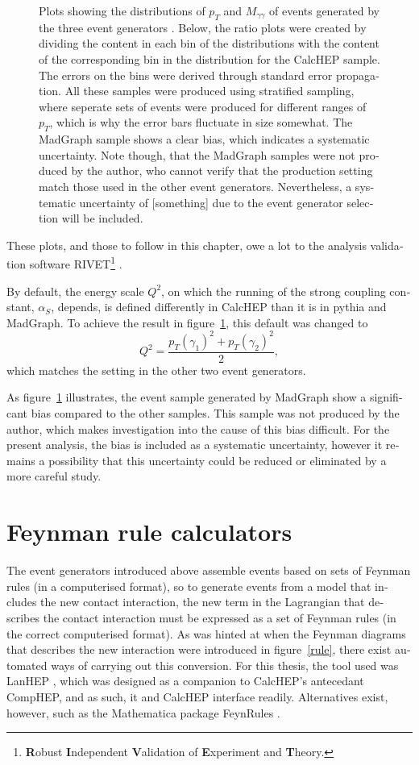 \begin{english}
\begin{figure}[htp]
\begin{minipage}[b]{.3\textwidth}
\phantom{p}
\end{minipage}
\caption{Plots showing the distributions of $p_T$ and $M_{\gamma\gamma}$ of events generated by the three event generators \cite{calchep} \cite{pythia} \cite{madgraph5}. Below, the ratio plots were created by dividing the content in each bin of the distributions with the content of the corresponding bin in the distribution for the CalcHEP sample. The errors on the bins were derived through standard error propagation. All these samples were produced using stratified sampling, where seperate sets of events were produced for different ranges of $p_T$, which is why the error bars fluctuate in size somewhat. The MadGraph sample shows a clear bias, which indicates a systematic uncertainty. Note though, that the MadGraph samples were not produced by the author, who cannot verify that the production setting match those used in the other event generators. Nevertheless, a systematic uncertainty of [something] due to the event generator selection will be included.
\label{evgen}}
\end{figure}

These plots, and those to follow in this chapter, owe a lot to the analysis validation software RIVET\footnote{\textbf{R}obust \textbf{I}ndependent \textbf{V}alidation of \textbf{E}xperiment and \textbf{T}heory.} \cite{rivet}.

By default, the energy scale $Q^2$, on which the running of the strong coupling constant, $\alpha_S$, depends, is defined differently in CalcHEP than it is in pythia and MadGraph. To achieve the result in figure~\ref{evgen}, this default was changed to 
\[Q^2=\frac{p_T(\gamma_1)^2+p_T(\gamma_2)^2}{2},\]
which matches the setting in the other two event generators.

As figure~\ref{evgen} illustrates, the event sample generated by MadGraph show a significant bias compared to the other samples. This sample was not produced by the author, which makes investigation into the cause of this bias difficult. For the present analysis, the bias is included as a systematic uncertainty, however it remains a possibility that this uncertainty could be reduced or eliminated by a more careful study.


\section{Feynman rule calculators}
The event generators introduced above assemble events based on sets of Feynman rules (in a computerised format), so to generate events from a model that includes the new contact interaction, the new term in the Lagrangian that describes the contact interaction must be expressed as a set of Feynman rules (in the correct computerised format). As was hinted at when the Feynman diagrams that describes the new interaction were introduced in figure~\ref{rule}, there exist automated ways of carrying out this conversion. For this thesis, the tool used was LanHEP \cite{lanhep}, which was designed as a companion to CalcHEP's antecedant CompHEP, and as such, it and CalcHEP interface readily. Alternatives exist, however, such as the Mathematica package FeynRules \cite{feynrules}. 


\end{english}
